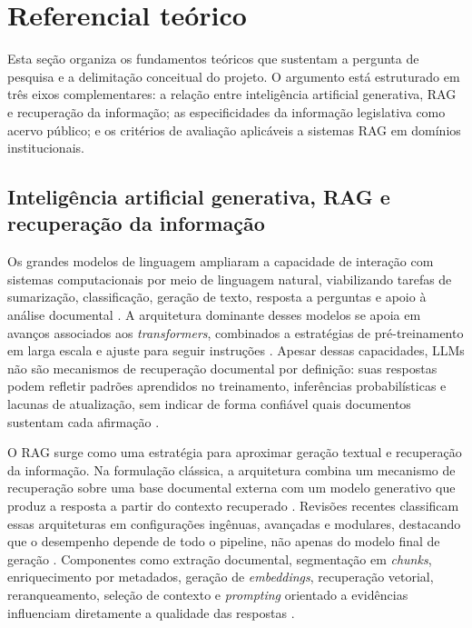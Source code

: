 \section{Referencial teórico}

Esta seção organiza os fundamentos teóricos que sustentam a pergunta de pesquisa e a delimitação conceitual do projeto. O argumento está estruturado em três eixos complementares: a relação entre inteligência artificial generativa, RAG e recuperação da informação; as especificidades da informação legislativa como acervo público; e os critérios de avaliação aplicáveis a sistemas RAG em domínios institucionais.

\subsection{Inteligência artificial generativa, RAG e recuperação da informação}

Os grandes modelos de linguagem ampliaram a capacidade de interação com sistemas computacionais por meio de linguagem natural, viabilizando tarefas de sumarização, classificação, geração de texto, resposta a perguntas e apoio à análise documental \parencite{brownEtAl2020fewShotLearners,zhaoEtAl2023llmSurvey,minaee2024llmSurvey}. A arquitetura dominante desses modelos se apoia em avanços associados aos \textit{transformers}, combinados a estratégias de pré-treinamento em larga escala e ajuste para seguir instruções \parencite{vaswani2017attention,brownEtAl2020fewShotLearners,ouyangEtAl2022instructGpt}. Apesar dessas capacidades, LLMs não são mecanismos de recuperação documental por definição: suas respostas podem refletir padrões aprendidos no treinamento, inferências probabilísticas e lacunas de atualização, sem indicar de forma confiável quais documentos sustentam cada afirmação \parencite{jiEtAl2023hallucinationSurvey,anhHoang2025hallucinations,dahlEtAl2024largeLegalFictions}.

O RAG surge como uma estratégia para aproximar geração textual e recuperação da informação. Na formulação clássica, a arquitetura combina um mecanismo de recuperação sobre uma base documental externa com um modelo generativo que produz a resposta a partir do contexto recuperado \parencite{lewisEtAl2020rag}. Revisões recentes classificam essas arquiteturas em configurações ingênuas, avançadas e modulares, destacando que o desempenho depende de todo o pipeline, não apenas do modelo final de geração \parencite{gao2023ragSurvey,gao2024modularRag}. Componentes como extração documental, segmentação em \textit{chunks}, enriquecimento por metadados, geração de \textit{embeddings}, recuperação vetorial, reranqueamento, seleção de contexto e \textit{prompting} orientado a evidências influenciam diretamente a qualidade das respostas \parencite{gupta2024comprehensiveRag,nie2024textEmbeddingSurvey}.

